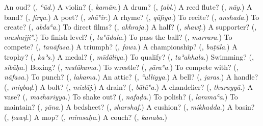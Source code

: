 \begin{tcolorbox}[breakable,colback=teal!4,colframe=teal!35!black,title={Before you move on}]
An oud? (\textbf{}, \emph{ʿūd}.) A violin? (\textbf{}, \emph{kamān}.) A drum? (\textbf{}, \emph{ṭabl}.) A reed flute? (\textbf{}, \emph{nāy}.) A band? (\textbf{}, \emph{firqa}.) A poet? (\textbf{}, \emph{shāʿir}.) A rhyme? (\textbf{}, \emph{qāfiya}.) To recite? (\textbf{}, \emph{anshada}.) To create? (\textbf{}, \emph{abdaʿa}.) To direct films? (\textbf{}, \emph{akhraja}.) A half? (\textbf{}, \emph{shawṭ}.) A supporter? (\textbf{}, \emph{mushajjiʿ}.) To finish level? (\textbf{}, \emph{taʿādala}.) To pass the ball? (\textbf{}, \emph{marrara}.) To compete? (\textbf{}, \emph{tanāfasa}.) A triumph? (\textbf{}, \emph{fawz}.) A championship? (\textbf{}, \emph{buṭūla}.) A trophy? (\textbf{}, \emph{kaʾs}.) A medal? (\textbf{}, \emph{mīdāliya}.) To qualify? (\textbf{}, \emph{taʾahhala}.) Swimming? (\textbf{}, \emph{sibāḥa}.) Boxing? (\textbf{}, \emph{mulākama}.) To wrestle? (\textbf{}, \emph{ṣāraʿa}.) To compete with? (\textbf{}, \emph{nāfasa}.) To punch? (\textbf{}, \emph{lakama}.) An attic? (\textbf{}, \emph{ʿulliyya}.) A bell? (\textbf{}, \emph{jaras}.) A handle? (\textbf{}, \emph{miqbaḍ}.) A bolt? (\textbf{}, \emph{mizlāj}.) A drain? (\textbf{}, \emph{bālūʿa}.) A chandelier? (\textbf{}, \emph{thurayyā}.) A vase? (\textbf{}, \emph{mazhariyya}.) To shake out? (\textbf{}, \emph{nafaḍa}.) To polish? (\textbf{}, \emph{lammaʿa}.) To maintain? (\textbf{}, \emph{ṣāna}.) A bedsheet? (\textbf{}, \emph{sharshaf}.) A cushion? (\textbf{}, \emph{mikhadda}.) A basin? (\textbf{}, \emph{ḥawḍ}.) A mop? (\textbf{}, \emph{mimsaḥa}.) A couch? (\textbf{}, \emph{kanaba}.)
\end{tcolorbox}
